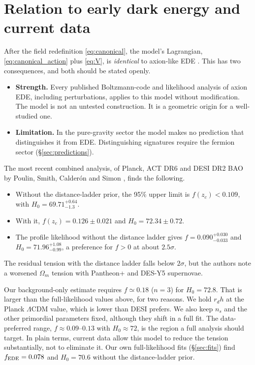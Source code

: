 \documentclass[11pt]{article}
\begin{document}
\section{Relation to early dark energy and current data}\label{sec:data}
After the field redefinition \eqref{eq:canonical}, the model's Lagrangian,
\eqref{eq:canonical_action} plus \eqref{eq:V}, is \emph{identical} to axion-like EDE
\cite{poulin2019}. This has two consequences, and both should be stated openly.
\begin{itemize}
\item \textbf{Strength.} Every published Boltzmann-code and likelihood analysis of
axion EDE, including perturbations, applies to this model without modification. The model
is not an untested construction. It is a geometric origin for a well-studied one.
\item \textbf{Limitation.} In the pure-gravity sector the model makes no prediction that
distinguishes it from EDE. Distinguishing signatures require the fermion sector
(\S\ref{sec:predictions}).
\end{itemize}

The most recent combined analysis, of Planck, ACT DR6 and DESI DR2 BAO by Poulin, Smith,
Calder\'on and Simon \cite{poulin2025}, finds the following.
\begin{itemize}
\item Without the distance-ladder prior, the 95\% upper limit is $f(z_c)<0.109$, with
$H_0=69.71^{+0.64}_{-1.3}$.
\item With it, $f(z_c)=0.126\pm0.021$ and $H_0=72.34\pm0.72$.
\item The profile likelihood without the distance ladder gives
$f=0.090^{+0.030}_{-0.033}$ and $H_0=71.96^{+1.08}_{-0.99}$, a preference for $f>0$ at about
$2.5\sigma$.
\end{itemize}
The residual tension with the distance ladder falls below $2\sigma$, but the authors note
a worsened $\Omega_m$ tension with Pantheon+ and DES-Y5 supernovae.

Our background-only estimate requires $f\simeq0.18$ ($n=3$) for $H_0=72.8$. That is larger
than the full-likelihood values above, for two reasons. We hold $r_dh$ at the Planck
$\Lambda$CDM value, which is lower than DESI prefers. We also keep $n_s$ and the other
primordial parameters fixed, although they shift in a full fit. The data-preferred range,
$f\approx0.09$--$0.13$ with $H_0\approx72$, is the region a full analysis should target.
In plain terms, current data allow this model to reduce the tension substantially, not
to eliminate it. Our own full-likelihood fits (\S\ref{sec:fits}) find $f_{\rm EDE}=0.078$ and
$H_0=70.6$ without the distance-ladder prior.
\end{document}
